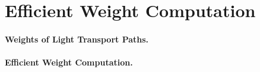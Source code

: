 \section{Efficient Weight Computation}
\label{sec:layeredbsdf:weight_computation}


\paragraph{Weights of Light Transport Paths.}

%


\paragraph{Efficient Weight Computation.}

